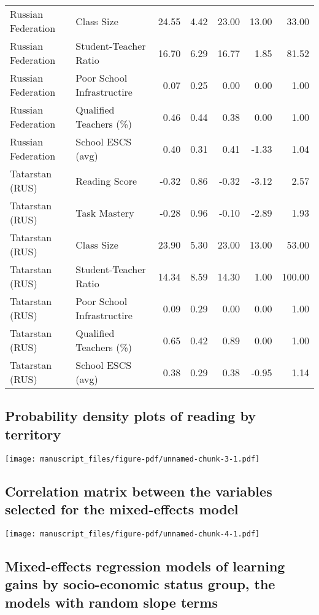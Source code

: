 \documentclass[
]{article}
\begin{document}
\begin{table}
\begin{tabular*}{\linewidth}{@{\extracolsep{\fill}}llrrrrr}
Russian Federation & Class Size & 24.55 & 4.42 & 23.00 & 13.00 & 33.00 \\ 
Russian Federation & Student-Teacher Ratio & 16.70 & 6.29 & 16.77 & 1.85 & 81.52 \\ 
Russian Federation & Poor School Infrastructire & 0.07 & 0.25 & 0.00 & 0.00 & 1.00 \\ 
Russian Federation & Qualified Teachers (\%) & 0.46 & 0.44 & 0.38 & 0.00 & 1.00 \\ 
Russian Federation & School ESCS (avg) & 0.40 & 0.31 & 0.41 & -1.33 & 1.04 \\ 
Tatarstan (RUS) & Reading Score & -0.32 & 0.86 & -0.32 & -3.12 & 2.57 \\ 
Tatarstan (RUS) & Task Mastery & -0.28 & 0.96 & -0.10 & -2.89 & 1.93 \\ 
Tatarstan (RUS) & Class Size & 23.90 & 5.30 & 23.00 & 13.00 & 53.00 \\ 
Tatarstan (RUS) & Student-Teacher Ratio & 14.34 & 8.59 & 14.30 & 1.00 & 100.00 \\ 
Tatarstan (RUS) & Poor School Infrastructire & 0.09 & 0.29 & 0.00 & 0.00 & 1.00 \\ 
Tatarstan (RUS) & Qualified Teachers (\%) & 0.65 & 0.42 & 0.89 & 0.00 & 1.00 \\ 
Tatarstan (RUS) & School ESCS (avg) & 0.38 & 0.29 & 0.38 & -0.95 & 1.14 \\ 
\bottomrule
\end{tabular*}
\end{table}

\subsection{Probability density plots of reading by
territory}\label{sec-app3}

\texttt{[image: manuscript\_files/figure-pdf/unnamed-chunk-3-1.pdf]}

\subsection{Correlation matrix between the variables selected for the
mixed-effects model}\label{sec-app4}

\texttt{[image: manuscript\_files/figure-pdf/unnamed-chunk-4-1.pdf]}

\subsection{Mixed-effects regression models of learning gains by
socio-economic status group, the models with random slope
terms}\label{sec-app6}
\end{document}
